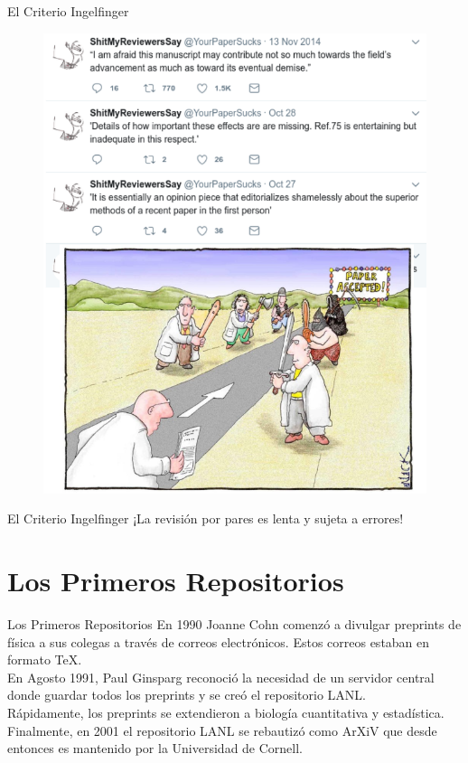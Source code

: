 \documentclass{beamer}
\begin{document}
\begin{frame}{El Criterio Ingelfinger}
\begin{figure}
\centering
 \includegraphics[width=.5\textwidth]{review}
\end{figure}
\end{frame}

\begin{frame}{El Criterio Ingelfinger}
\Large
\centering
¡La revisión por pares es lenta y sujeta a errores!
\end{frame}

\section{Los Primeros Repositorios}
\begin{frame}{Los Primeros Repositorios}
En 1990 Joanne Cohn comenzó a divulgar preprints de física a sus colegas a través de correos electrónicos. Estos correos estaban en formato \TeX{}.
\vspace{0.5cm}
\pause\\
En Agosto 1991, Paul Ginsparg reconoció la necesidad de un servidor central donde guardar todos los preprints y se creó el repositorio LANL.
\vspace{0.5cm}
\pause\\
Rápidamente, los preprints se extendieron a biología cuantitativa y estadística.\vspace{0.5cm}
\pause\\
Finalmente, en 2001 el repositorio LANL se rebautizó como ArXiV que desde entonces es mantenido por la Universidad de Cornell.
\end{frame}
\end{document}
